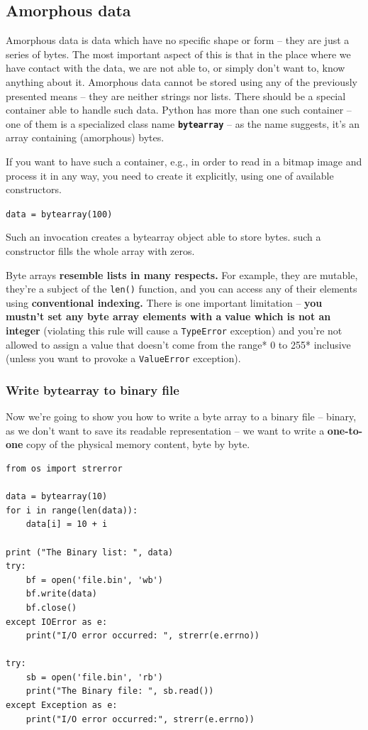 \documentclass[11pt]{article}
\begin{document}
\subsection{Amorphous data}
\label{sec:org6c7088e}
Amorphous data is data which have no specific shape or form – they are
just a series of bytes. The most important aspect of this is that in
the place where we have contact with the data, we are not able to, or
simply don’t want to, know anything about it. Amorphous data cannot be
stored using any of the previously presented means – they are neither
strings nor lists. There should be a special container able to handle
such data. Python has more than one such container – one of them is a
specialized class name \textbf{\texttt{bytearray}} – as the name suggests, it’s an array
containing (amorphous) bytes.

If you want to have such a container, e.g., in order to read in a
bitmap image and process it in any way, you need to create it
explicitly, using one of available constructors.

\texttt{data = bytearray(100)}

Such an invocation creates a bytearray object able to store
bytes. such a constructor fills the whole array with zeros.

Byte arrays \textbf{resemble lists in many respects.} For example, they are
mutable, they’re a subject of the \texttt{len()} function, and you can access
any of their elements using \textbf{conventional indexing.} There is one
important limitation – \textbf{you mustn’t set any byte array elements with a}
\textbf{value which is not an integer} (violating this rule will cause a
\texttt{TypeError} exception) and you’re not allowed to assign a value that
doesn’t come from the range* 0 to 255* inclusive (unless you want to
provoke a \texttt{ValueError} exception).

\subsubsection{Write bytearray to binary file}
\label{sec:org0dc548b}
Now we’re going to show you how to write a byte array to a binary file
– binary, as we don’t want to save its readable representation – we
want to write a \textbf{one-to-one} copy of the physical memory content, byte
by byte.

\begin{verbatim}
from os import strerror

data = bytearray(10)
for i in range(len(data)):
	data[i] = 10 + i

print ("The Binary list: ", data)
try:
	bf = open('file.bin', 'wb')
	bf.write(data)
	bf.close()
except IOError as e:
	print("I/O error occurred: ", strerr(e.errno))

try:
	sb = open('file.bin', 'rb')
	print("The Binary file: ", sb.read())
except Exception as e:
	print("I/O error occurred:", strerr(e.errno))
\end{verbatim}
\end{document}
